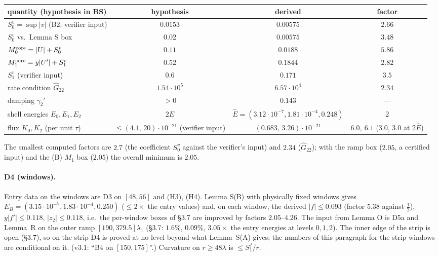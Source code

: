 \documentclass[11pt]{article}
\theoremstyle{definition}
\theoremstyle{remark}
\begin{document}
\begin{center}\small\begin{tabular}{@{}lccc@{}}\toprule
quantity (hypothesis in BS) & hypothesis & derived & factor\\\midrule
$S_0^v=\sup|v|$ (B2; verifier input) & $0.0153$ & $0.00575$ & $2.66$\\
$S_0^v$ vs.\ Lemma S box & $0.02$ & $0.00575$ & $3.48$\\
$M_0^{\rm core}=|U|+S_0^v$ & $0.11$ & $0.0188$ & $5.86$\\
$M_1^{\rm core}=y|U'|+S_1^v$ & $0.52$ & $0.1844$ & $2.82$\\
$S_1^v$ (verifier input) & $0.6$ & $0.171$ & $3.5$\\
rate condition $\hat G_{22}$ & $1.54\cdot10^5$ & $6.57\cdot10^4$ & $2.34$\\
damping $\gamma_2'$ & $>0$ & $0.143$ & ---\\
shell energies $E_0,E_1,E_2$ & $2\hat E$ & $\hat E=(3.12\cdot10^{-7},1.81\cdot10^{-4},0.248)$ & $2$\\
flux $K_0,K_2$ (per unit $\tau$) & $\le(4.1,\,20)\cdot10^{-21}$ (verifier input) & $(0.683,\,3.26)\cdot10^{-21}$ & $6.0,\ 6.1$ ($3.0,\,3.0$ at $2\hat E$)\\\bottomrule\end{tabular}\end{center}
The smallest computed factors are $2.7$ (the coefficient $S_0^v$ against the verifier's input) and $2.34$ ($\hat G_{22}$); with the ramp box ($2.05$, a certified input) and the (B) $M_1$ box ($2.05$) the overall minimum is $2.05$.

\paragraph{D4 (windows).} Entry data on the windows are D3 on $[48,56]$ and (H3), (H4). Lemma S(B) with physically fixed windows gives $E_B=(3.15\cdot10^{-7},1.83\cdot10^{-4},0.250)$ ($\le2\times$ the entry values) and, on each window, the derived $|f|\le0.093$ (factor $5.38$ against $\tfrac12$), $y|f'|\le0.118$, $|z_2|\le0.118$, i.e.\ the per-window boxes of \S3.7 are improved by factors $2.05$--$4.26$. The input from Lemma O is D5a and Lemma~R on the outer ramp $[190,379.5]\lambda_1$ (\S3.7: $1.6\%$, $0.09\%$, $3.05\times$ the entry energies at levels $0,1,2$). The inner edge of the strip is open (\S3.7), so on the strip D4 is proved at no level beyond what Lemma~S(A) gives; the numbers of this paragraph for the strip windows are conditional on it. (v3.1: ``B4 on $[150,175]$''.) Curvature on $r\ge48\lambda$ is $\le S_1^f/r$.
\end{document}
